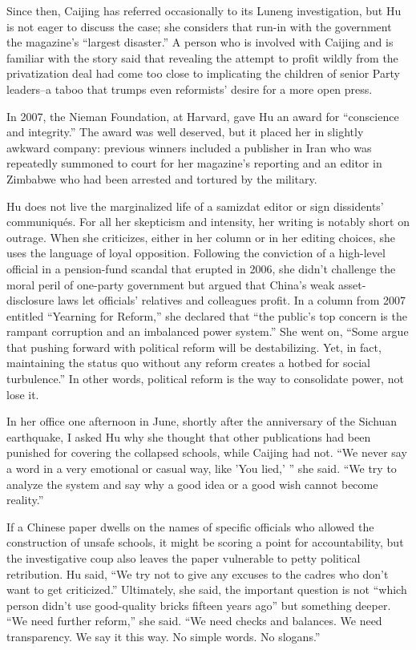 ﻿\documentclass[12pt]{article}
\begin{document}
Since then, Caijing has referred occasionally to its Luneng investigation, but Hu is not eager to
discuss the case; she considers that run-in with the government the magazine's ``largest disaster.''
A person who is involved with Caijing and is familiar with the story said that revealing the attempt
to profit wildly from the privatization deal had come too close to implicating the children of
senior Party leaders--a taboo that trumps even reformists' desire for a more open press.

In 2007, the Nieman Foundation, at Harvard, gave Hu an award for ``conscience and integrity.'' The
award was well deserved, but it placed her in slightly awkward company: previous winners included a
publisher in Iran who was repeatedly summoned to court for her magazine's reporting and an editor in
Zimbabwe who had been arrested and tortured by the military.

Hu does not live the marginalized life of a samizdat editor or sign dissidents' communiqu\'es. For
all her skepticism and intensity, her writing is notably short on outrage. When she criticizes,
either in her column or in her editing choices, she uses the language of loyal opposition. Following
the conviction of a high-level official in a pension-fund scandal that erupted in 2006, she didn't
challenge the moral peril of one-party government but argued that China's weak asset-disclosure laws
let officials' relatives and colleagues profit. In a column from 2007 entitled ``Yearning for
Reform,'' she declared that ``the public's top concern is the rampant corruption and an imbalanced
power system.'' She went on, ``Some argue that pushing forward with political reform will be
destabilizing. Yet, in fact, maintaining the status quo without any reform creates a hotbed for
social turbulence.'' In other words, political reform is the way to consolidate power, not lose it.

In her office one afternoon in June, shortly after the anniversary of the Sichuan earthquake, I
asked Hu why she thought that other publications had been punished for covering the collapsed
schools, while Caijing had not. ``We never say a word in a very emotional or casual way, like 'You
lied,' '' she said. ``We try to analyze the system and say why a good idea or a good wish cannot
become reality.''

If a Chinese paper dwells on the names of specific officials who allowed the construction of unsafe
schools, it might be scoring a point for accountability, but the investigative coup also leaves the
paper vulnerable to petty political retribution. Hu said, ``We try not to give any excuses to the
cadres who don't want to get criticized.'' Ultimately, she said, the important question is not
``which person didn't use good-quality bricks fifteen years ago'' but something deeper. ``We need
further reform,'' she said. ``We need checks and balances. We need transparency. We say it this way.
No simple words. No slogans.''
\end{document}
